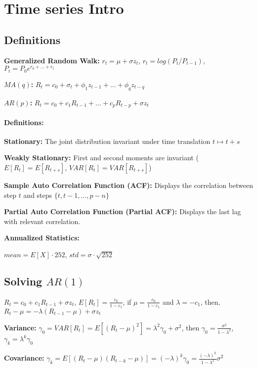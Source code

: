\section{Time series Intro}

\subsection{Definitions}

\textbf{Generalized Random Walk:}
$r_t = \mu + \sigma z_t$, $r_t = log(P_t / P_{t-1})$, $P_t = P_0 e^{r_0 + \ldots + r_t}$

\textbf{$MA(q)$:} $R_t = c_0 + \sigma_t + \phi_1 z_{t-1} + \ldots + \phi_{q} z_{t-q}$

\textbf{$AR(p)$:} $R_t = c_0 + c_1 R_{t-1} + \ldots + c_{p} R_{t-p} + \sigma z_t$


\paragraph{Definitions:}

\textbf{Stationary:} The joint distribution invariant under time translation $t \mapsto t+s$

\textbf{Weakly Stationary:} First and second moments are invariant ($E[R_t] = E[R_{t+s}]$, $VAR[R_t] = VAR[R_{t+s}]$)

\textbf{Sample Auto Correlation Function (ACF):} Displays the correlation between step $t$ and steps $\{t, t-1, \ldots, p-n \}$

\textbf{Partial Auto Correlation Function (Partial ACF):} Displays the last lag with relevant correlation.

\textbf{Annualized Statistics:}

$mean = E[X] \cdot 252$, $std = \sigma \cdot \sqrt{252}$


\subsection{Solving $AR(1)$}
$R_t = c_0 + c_1 R_{t-1} + \sigma z_t$, $E[R_t] = \frac{c_0}{1-c_1}$, if $\mu = \frac{c_0}{1-c_1}$ and $\lambda = -c_1$, then, \\ $R_t - \mu = -\lambda(R_{t-1} - \mu) + \sigma z_t$

\textbf{Variance:} $\gamma_0 = VAR[R_t] = E[(R_t - \mu)^2] = \lambda^2\gamma_0 + \sigma^2$, then $\gamma_0 = \frac{\sigma^2}{1-\lambda^2}$, $\gamma_k = \lambda ^k \gamma_0$

\textbf{Covariance:} $\gamma_k =E[(R_t - \mu)(R_{t-k} - \mu)] = (-\lambda)^k \gamma_0 = \frac{(-\lambda)^k}{1-\lambda^2}\sigma^2$

